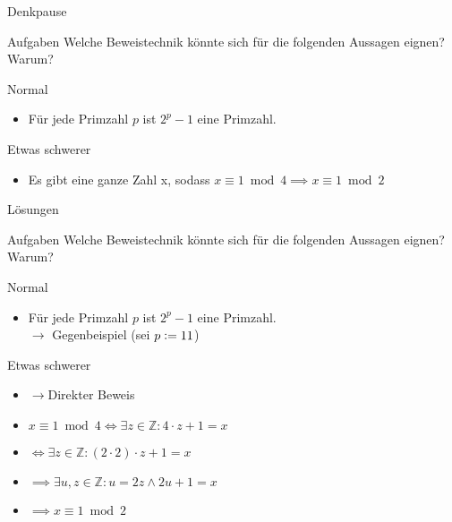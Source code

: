 {
\begin{frame}[fragile]{Denkpause}
    \begin{alertblock}{Aufgaben}
    Welche Beweistechnik könnte sich für die folgenden Aussagen eignen? Warum?
    \end{alertblock}
    
    \begin{block}{Normal}
        \begin{itemize}
            \item Für jede Primzahl $p$ ist $2^p-1$ eine Primzahl.
        \end{itemize}
    \end{block}
    \begin{block}{Etwas schwerer}
    \begin{itemize}
            \item Es gibt eine ganze Zahl x, sodass $x\equiv 1\bmod 4 \implies x\equiv 1\bmod 2$ 
    \end{itemize}
        
    \end{block}
\end{frame}
}

{
\begin{frame}[fragile]{Lösungen}
    \begin{alertblock}{Aufgaben}
    Welche Beweistechnik könnte sich für die folgenden Aussagen eignen? Warum?
    \end{alertblock}
    
    \begin{block}{Normal}
        \begin{itemize}
            \item Für jede Primzahl $p$ ist $2^p-1$ eine Primzahl.\\
            $\rightarrow$ Gegenbeispiel (sei $p\vcentcolon=11$)
        \end{itemize}
    \end{block}
    \begin{block}{Etwas schwerer}
        \begin{itemize}
            \item[] $\rightarrow$Direkter Beweis
            \item $x\equiv 1\bmod 4\iff\exists z\in\mathbb{Z} : 4 \cdot z + 1 = x$
            \item $\iff\exists z\in\mathbb{Z}: (2 \cdot 2) \cdot z + 1 = x$
            \item $\implies\exists u,z\in\mathbb{Z}: u = 2z\wedge 2u + 1 = x$
            \item $\implies x\equiv 1\bmod 2$
        \end{itemize}
    \end{block}
\end{frame}
}

